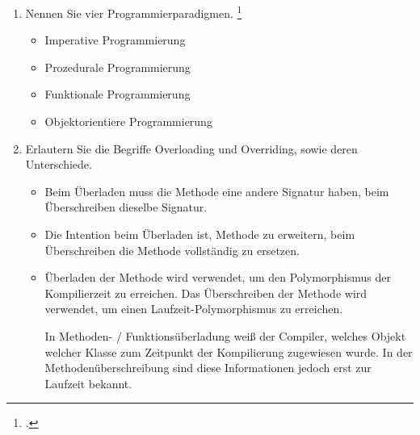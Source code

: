 \documentclass{lehramt-informatik-aufgabe}
\begin{document}

\begin{enumerate}


\item Nennen Sie vier Programmierparadigmen.
\footcite{examen:66116:2021:03}

\begin{liAntwort}
\begin{itemize}
\item Imperative Programmierung
\item Prozedurale Programmierung
\item Funktionale Programmierung
\item Objektorientiere Programmierung
\end{itemize}
\end{liAntwort}


\item Erlautern Sie die Begriffe Overloading und Overriding, sowie deren
Unterschiede.

\begin{liAntwort}
\begin{itemize}
\item Beim Überladen muss die Methode eine andere Signatur haben, beim
Überschreiben dieselbe Signatur.

\item Die Intention beim Überladen ist, Methode zu erweitern, beim
Überschreiben die Methode vollständig zu ersetzen.

\item Überladen der Methode wird verwendet, um den Polymorphismus der
Kompilierzeit zu erreichen. Das Überschreiben der Methode wird
verwendet, um einen Laufzeit-Polymorphismus zu erreichen.

In Methoden- / Funktionsüberladung weiß der Compiler, welches Objekt
welcher Klasse zum Zeitpunkt der Kompilierung zugewiesen wurde. In
der Methodenüberschreibung sind diese Informationen jedoch erst zur
Laufzeit bekannt.


\end{itemize}
\end{liAntwort}
\end{enumerate}
\end{document}
